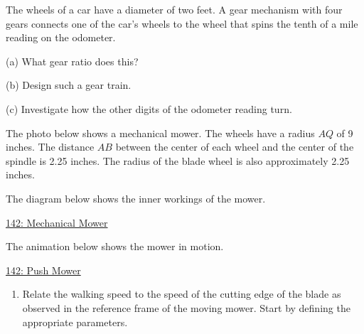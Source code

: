 \documentclass{ximera}
\begin{document}
\begin{question}  \label{Q323342:Angles}
The wheels of a car have a diameter of two feet. A gear mechanism with four gears connects one of the car's wheels to the wheel that spins the tenth of a mile reading on the odometer. %

(a) What gear ratio does this?

(b) Design such a gear train.

(c) Investigate how the other digits of the odometer reading turn.
\end{question}


\begin{question}    \label{Q850:Angles}
The photo below shows a mechanical mower. The wheels have a radius $AQ$ of 9 inches. The distance $AB$ between the center of each wheel and the center of the spindle is 2.25 inches. The radius of the blade wheel is also approximately 2.25 inches.

 
\begin{onlineOnly}
    \begin{center}
\end{center}
\end{onlineOnly}

The diagram below shows the inner workings of the mower.
\begin{onlineOnly}
\begin{center}
\end{center}
\end{onlineOnly}

\href{https://www.desmos.com/calculator/lsxarkvo6r}{142: Mechanical Mower}

The animation below shows the  mower in motion.

\begin{onlineOnly}
\begin{center}
\end{center}
\end{onlineOnly}

\href{https://www.desmos.com/calculator/3yjpzc2s1s}{142: Push Mower}



\begin{enumerate}
\item Relate the walking speed to the speed of the cutting edge of the blade as observed in the reference frame of the moving mower. Start by defining the appropriate parameters.
\end{enumerate}

\end{question}
\end{document}
